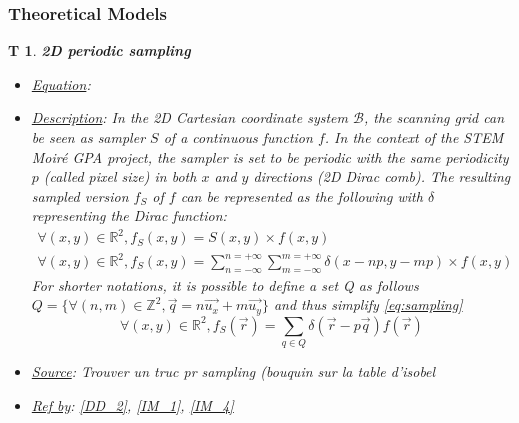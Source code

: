 \documentclass[12pt]{article}
\newcommand{\progname}{STEM Moir{\'e} GPA}
\newtheorem{T}{T}
\begin{document}
\subsubsection{Theoretical Models}\label{sec_theoretical}

\begin{T}
\label{T_1}
\noindent\colorbox{shadecolorT}{\normalfont \textbf{2D periodic sampling}}
\normalfont
\begin{itemize}
\item \underline{Equation}: 
\item \underline{Description}: In the 2D Cartesian coordinate system $\mathcal{B}$, the scanning grid can be seen as sampler $S$ of a continuous function $f$. In the context of the \progname{} project, the sampler is set to be periodic with the same periodicity $p$ (called pixel size) in both $x$ and $y$ directions (2D Dirac comb). The resulting sampled version $f_S$ of $f$ can be represented as the following with $\delta$ representing the Dirac function:
\begin{equation}
\begin{gathered}
\forall (x,y) \in \mathbb{R}^{2}, f_S(x,y)=S(x,y)\times f(x,y) \\
\forall (x,y) \in \mathbb{R}^{2}, f_S(x,y)=\sum_{n=-\infty}^{n=+\infty}\sum_{m=-\infty}^{m=+\infty}\delta(x-np,y-mp)\times f(x,y)
\end{gathered}
\label{eq:sampling}
\end{equation}
For shorter notations, it is possible to define a set Q as follows $Q=\{\forall (n,m) \in \mathbb{Z}^{2}, \vec{q}=n\vec{u_x}+m\vec{u_y}\}$ and thus simplify \cref{eq:sampling}
\begin{equation}
\forall (x,y) \in \mathbb{R}^{2}, f_S(\vec{r})=\sum_{q\in Q}\delta(\vec{r}-p\vec{q}) f(\vec{r})
\label{eq:sampling_simplified}
\end{equation}
\item \underline{Source}: Trouver un truc pr sampling (bouquin sur la table d'isobel
\item \underline{Ref by}: \cref{DD_2}, \cref{IM_1}, \cref{IM_4}
\end{itemize}
\end{T}
\end{document}
